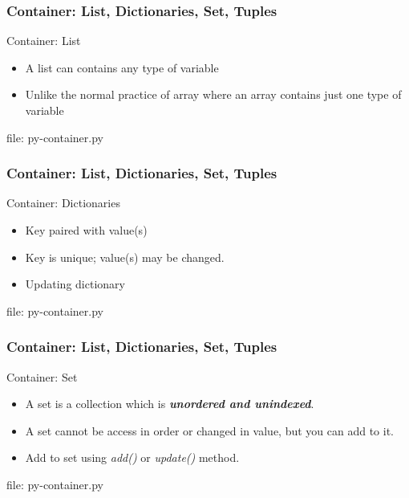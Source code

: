 \begin{frame}[fragile]
\frametitle{Container: List, Dictionaries, Set, Tuples}
\newcommand{\newfilename}{py-container.py}
Container: List
\begin{itemize}
\item A list can contains any type of variable
\item Unlike the normal practice of array where an array contains just one type of variable
\end{itemize}


file: \newfilename
\end{frame}

\begin{frame}[fragile]
\frametitle{Container: List, Dictionaries, Set, Tuples}
\newcommand{\newfilename}{py-container.py}
Container: Dictionaries
\begin{itemize}
\item Key paired with value(s)
\item Key is unique; value(s) may be changed.



\item Updating dictionary



\end{itemize}
file: \newfilename
\end{frame}

\begin{frame}[fragile]
\frametitle{Container: List, Dictionaries, Set, Tuples}
\newcommand{\newfilename}{py-container.py}
Container: Set
\begin{itemize}
\item A set is a collection which is \textbf{\emph{unordered and unindexed}}.
\item A set cannot be access in order or changed in value, but you can add to it.



\item Add to set using \emph{add()} or \emph{update()} method.




\end{itemize}

file: \newfilename
\end{frame}

